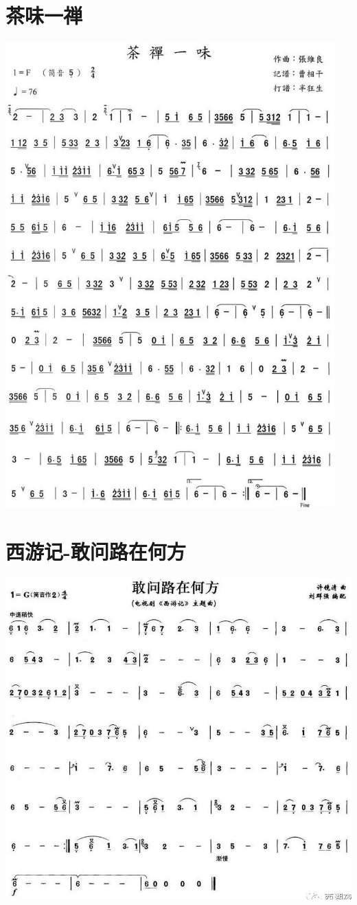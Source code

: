 \documentclass[cn,pad,twocol]{elegantbook}
\begin{document}
\section{茶味一禅}\includegraphics[width=0.95\textwidth]{dongxiao/20200819/茶禅一味.jpeg}
\section{西游记-敢问路在何方}\includegraphics[width=\textwidth]{dongxiao/20200819/西游记-敢问路在何方.jpeg}
\end{document}
